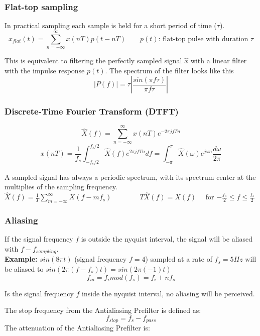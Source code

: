 \begin{center}

\end{center}

\subsubsection{Flat-top sampling }
In practical sampling each sample is held for a short period of time ($\tau$).
\[ x_{flat}(t) =  \sum_{n=-\infty}^{\infty}x(nT)p(t - nT) \qquad p(t) \text{: flat-top pulse with duration } \tau \]

This is equivalent to filtering the perfectly sampled signal $\hat{x}$ with a linear filter with the impulse response $p(t)$.
The spectrum of the filter looks like this
\[ |P(f)| = \tau \left| \frac{sin(\pi f \tau)}{\pi f \tau} \right| \]

\subsubsection{Discrete-Time Fourier Transform (DTFT)}
\[
	\hat{X}(f) = \sum_{n=-\infty}^{\infty} x(nT)e^{-2\pi jfTn}
\]
\[
	x(nT) = \frac{1}{f_s} \int_{-f_s/2}^{f_s/2}\hat{X}(f)e^{2\pi jfTn}df = \int_{-\pi}^{\pi}\hat{X}(\omega)e^{j\omega n} \frac{d \omega}{2 \pi}
\]

  A sampled signal has always a periodic spectrum, with its spectrum center at the multiplies of the sampling frequency.\\
  $\hat{X}(f) = \frac{1}{T}\sum\limits_{m=-\infty}^{\infty}X(f-mf_s) \qquad \qquad
  T\hat{X}(f) = X(f) \quad$ for $-\frac{f_s}{2} \leq f \leq \frac{f_s}{2}$





\subsubsection{Aliasing}
If the signal frequency $f$ is outside the nyquist interval, the signal will be
aliased with $f - f_{sampling}$.\\
\textbf{Example:} $sin(8\pi t)$ (signal frequency $f=4$) sampled at a rate of
$f_s=5Hz$ will be aliased to $sin(2\pi (f-f_s) t) = sin(2\pi (-1) t)$
\[ f_{ia} = f_i mod (f_s) = f_i + nf_s \]

Is the signal frequency $f$ inside the nyquist interval, no aliasing will be
perceived.

The stop frequency from the Antialiasing Prefilter is defined as:
\[ f_{stop} = f_s - f_{pass} \]
The attenuation of the Antialiasing Prefilter is:

